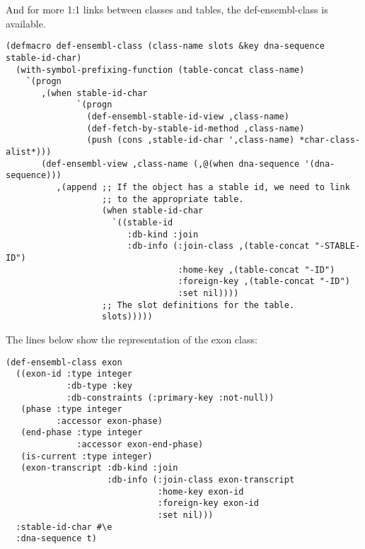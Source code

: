\documentclass{book}
\begin{document}
And for more 1:1 links between classes and tables, the def-ensembl-class is available.

\begin{lstlisting}
(defmacro def-ensembl-class (class-name slots &key dna-sequence stable-id-char)
  (with-symbol-prefixing-function (table-concat class-name)
    `(progn
       ,(when stable-id-char
              `(progn
                (def-ensembl-stable-id-view ,class-name)
                (def-fetch-by-stable-id-method ,class-name)
                (push (cons ,stable-id-char ',class-name) *char-class-alist*)))
       (def-ensembl-view ,class-name (,@(when dna-sequence '(dna-sequence)))
          ,(append ;; If the object has a stable id, we need to link
                   ;; to the appropriate table.
                   (when stable-id-char
                     `((stable-id
                        :db-kind :join
                        :db-info (:join-class ,(table-concat "-STABLE-ID")
                                  :home-key ,(table-concat "-ID")
                                  :foreign-key ,(table-concat "-ID")
                                  :set nil))))
                   ;; The slot definitions for the table.
                   slots)))))
\end{lstlisting}

The lines below show the representation of the exon class:
\begin{lstlisting}
(def-ensembl-class exon
  ((exon-id :type integer
            :db-type :key
            :db-constraints (:primary-key :not-null))
   (phase :type integer
          :accessor exon-phase)
   (end-phase :type integer
              :accessor exon-end-phase)
   (is-current :type integer)
   (exon-transcript :db-kind :join
                    :db-info (:join-class exon-transcript
                              :home-key exon-id
                              :foreign-key exon-id
                              :set nil)))
  :stable-id-char #\e
  :dna-sequence t)
\end{lstlisting}
\end{document}
